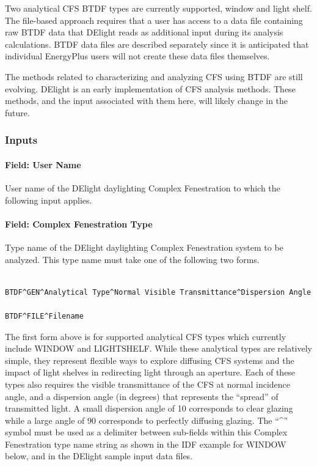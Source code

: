 Two analytical CFS BTDF types are currently supported, window and light shelf. The file-based approach requires that a user has access to a data file containing raw BTDF data that DElight reads as additional input during its analysis calculations. BTDF data files are described separately since it is anticipated that individual EnergyPlus users will not create these data files themselves.

The methods related to characterizing and analyzing CFS using BTDF are still evolving. DElight is an early implementation of CFS analysis methods. These methods, and the input associated with them here, will likely change in the future.

\subsubsection{Inputs}\label{inputs-3-007}

\paragraph{Field: User Name}\label{field-user-name}

User name of the DElight daylighting Complex Fenestration to which the following input applies.

\paragraph{Field: Complex Fenestration Type}\label{field-complex-fenestration-type}

Type name of the DElight daylighting Complex Fenestration system to be analyzed. This type name must take one of the following two forms.


\begin{lstlisting}

BTDF^GEN^Analytical Type^Normal Visible Transmittance^Dispersion Angle

BTDF^FILE^Filename

\end{lstlisting}

The first form above is for supported analytical CFS types which currently include WINDOW and LIGHTSHELF. While these analytical types are relatively simple, they represent flexible ways to explore diffusing CFS systems and the impact of light shelves in redirecting light through an aperture. Each of these types also requires the visible transmittance of the CFS at normal incidence angle, and a dispersion angle (in degrees) that represents the ``spread'' of transmitted light. A small dispersion angle of 10 corresponds to clear glazing while a large angle of 90 corresponds to perfectly diffusing glazing. The ``\^{}'' symbol must be used as a delimiter between sub-fields within this Complex Fenestration type name string as shown in the IDF example for WINDOW below, and in the DElight sample input data files.

